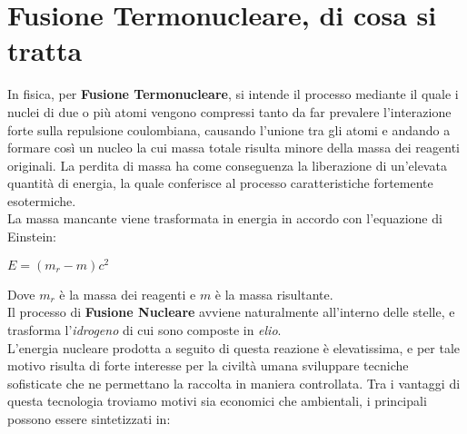 \section*{Fusione Termonucleare, di cosa si tratta}
In fisica, per \textbf{Fusione Termonucleare}, si intende il processo mediante il quale i nuclei di due o più atomi vengono compressi tanto da far prevalere l’interazione forte sulla repulsione coulombiana, causando l'unione tra gli atomi e andando a formare così un nucleo la cui massa totale risulta minore della massa dei reagenti originali. La perdita di massa ha come conseguenza la liberazione di un’elevata quantità di energia, la quale conferisce al processo caratteristiche fortemente esotermiche.\\
La massa mancante viene trasformata in energia in accordo con l’equazione di Einstein:
\begin{center}
	$E = (m_r - m)c^2$
\end{center}
Dove $ m_r $ è la massa dei reagenti e $ m $ è la massa risultante.\\
Il processo di \textbf{Fusione Nucleare} avviene naturalmente all'interno delle stelle, e trasforma l'\textit{idrogeno} di cui sono composte in \textit{elio}.\\
L'energia nucleare prodotta a seguito di questa reazione è elevatissima, e per tale motivo risulta di forte interesse per la civiltà umana sviluppare tecniche sofisticate che ne permettano la raccolta in maniera controllata. Tra i vantaggi di questa tecnologia troviamo motivi sia economici che ambientali, i principali possono essere sintetizzati in:
